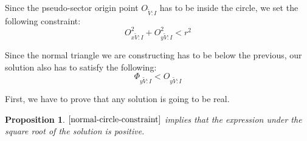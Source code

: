 \documentclass[a4paper,12pt]{article}
\newcommand{\HSview}[1][V]{\widetilde{#1}}
\newcommand{\HSPHIy}[1][I]{\Phi_{y\HSview:#1}}
\newcommand{\HSO}[1][I]{O_{\HSview:#1}}
\newcommand{\HSOx}[1][I]{O_{x\HSview:#1}}
\newcommand{\HSOy}[1][I]{O_{y\HSview:#1}}
\newtheorem{proposition}[theorem]{Proposition}
\theoremstyle{definition}
\theoremstyle{plain}
\begin{document}
	Since the pseudo-sector origin point $\HSO$ has to be inside the circle, we set the following constraint:
	\begin{equation}
		\HSOx^2 + \HSOy^2 < r^2 \label{normal-circle-constraint}
	\end{equation}

	Since the normal triangle we are constructing has to be below the previous, our solution also has to satisfy the following:
	\begin{equation}
		\HSPHIy < \HSOy \label{normal-height-requirement}
	\end{equation}

	\newpage

	First, we have to prove that any solution is going to be real.
	\begin{proposition} \label{normal-real-solution-exists}
		$\eqref{normal-circle-constraint}$ implies that the expression under the square root of the solution is positive.
	\end{proposition}
\end{document}
